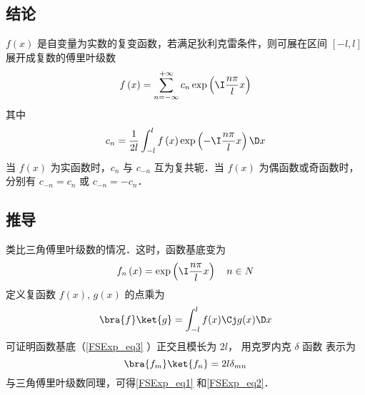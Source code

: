 
\subsection{结论}

$f(x)$ 是自变量为实数的复变函数，若满足狄利克雷条件，则可展在区间 $[ - l,l]$ 展开成复数的傅里叶级数
 \begin{equation}\label{FSExp_eq1}
f\left( x \right) = \sum\limits_{n =  - \infty }^{ + \infty } {{c_n}\exp \left( {\I\frac{n\pi }{l}x} \right)}  
\end{equation}
其中
 \begin{equation}\label{FSExp_eq2}
{c_n} = \frac{1}{{2l}}\int_{ - l}^l {f\left( x \right)\exp \left( {-\I\frac{n\pi }{l}x} \right)\D x} 
\end{equation}
当 $f(x)$ 为实函数时，$c_n$ 与 $c_{-n}$ 互为复共轭．当 $f(x)$ 为偶函数或奇函数时，分别有 $c_{-n} = c_n$ 或 $c_{-n} = -c_n$．

\subsection{推导}
类比三角傅里叶级数的情况．这时，函数基底变为
 \begin{equation}\label{FSExp_eq3}
{f_n}\left( x \right) = \exp \left( {\I\frac{n\pi }{l}x} \right) \quad{n \in N}
\end{equation} 
定义复函数 $f(x)$, $g(x)$ 的点乘为
\begin{equation}
\bra{f}\ket{g} = \int_{-l}^{l}  f(x)\Cj g(x) \D x
\end{equation}
可证明函数基底（\autoref{FSExp_eq3} ）正交且模长为 $2l$， 用克罗内克 $\delta$ 函数%
表示为
\begin{equation}
\bra{f_m}\ket{f_n} = 2l{\delta _{mn}}
\end{equation}      
与三角傅里叶级数同理，可得\autoref{FSExp_eq1} 和\autoref{FSExp_eq2}．

